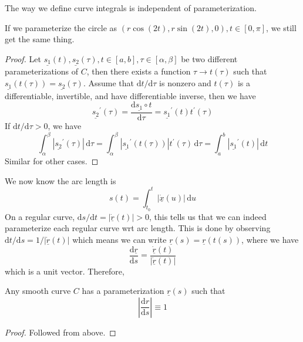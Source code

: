 \begin{proposition}
    The way we define curve integrals is independent of parameterization.
\end{proposition}
\begin{example}
    If we parameterize the circle as $(r\cos(2t),r\sin(2t),0),t\in [0,\pi]$, we still get the same thing.
\end{example}
\begin{proof}
    Let $\underline{s_1}(t),\underline{s_2}(\tau),t\in[a,b],\tau\in[\alpha,\beta]$ be two different parameterizations of $C$, then there exists a function $\tau\to t(\tau)$ such that $\underline{s_1}(t(\tau))=\underline{s_2}(\tau)$.
    Assume that $\mathrm dt/\mathrm d\tau$ is nonzero and $t(\tau)$ is a differentiable, invertible, and have differentiable inverse, then we have
    $$\underline{s_2}^\prime(\tau)=\frac{\mathrm d\underline{s_1}\circ t}{\mathrm d\tau}=\underline{s_1}^\prime(t)t^\prime(\tau)$$
    If $\mathrm dt/\mathrm d\tau>0$, we have
    $$\int_\alpha^\beta|\underline{s_2}^\prime(\tau)|\,\mathrm d\tau=\int_\alpha^\beta|\underline{s_1}^\prime(t(\tau))|t^\prime(\tau)\,\mathrm d\tau=\int_a^b|\underline{s_1}^\prime(t)|\,\mathrm dt$$
    Similar for other cases.
\end{proof}
We now know the arc length is
$$s(t)=\int_{t_0}^t|\underline{\dot{x}}(u)|\,\mathrm du$$
On a regular curve, $\mathrm ds/\mathrm dt=|\underline{\dot{r}}(t)|>0$, this tells us that we can indeed parameterize each regular curve wrt arc length.
This is done by observing $\mathrm dt/\mathrm ds=1/|\underline{\dot{r}}(t)|$ which means we can write $\underline{r}(s)=\underline{r}(t(s))$, where we have
$$\frac{\mathrm d\underline{r}}{\mathrm ds}=\frac{\underline{\dot{r}}(t)}{|\underline{\dot{r}}(t)|}$$
which is a unit vector.
Therefore,
\begin{lemma}
    Any smooth curve $C$ has a parameterization $\underline{r}(s)$ such that
    $$\left|\frac{\mathrm dr}{\mathrm ds}\right|\equiv 1$$
\end{lemma}
\begin{proof}
    Followed from above.
\end{proof}
